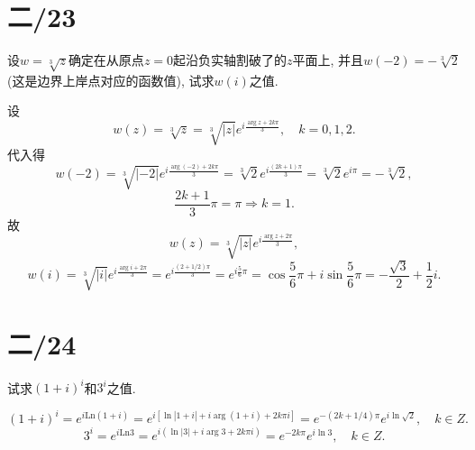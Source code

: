 \documentclass[11pt,a4paper]{article}
\begin{document}
\section{二/23}
\begin{problem}
设$w=\sqrt[3]{z}$确定在从原点$z=0$起沿负实轴割破了的$z$平面上, 并且$w(-2)=-\sqrt[3]{2}$(这是边界上岸点对应的函数值), 试求$w(i)$之值.
\end{problem}
设
$$w(z)=\sqrt[3]{z}=\sqrt[3]{|z|}e^{i\frac{\arg z+2k\pi}{3}},\quad k=0,1,2.$$
代入得
$$w(-2)=\sqrt[3]{|-2|}e^{i\frac{\arg(-2)+2k\pi}{3}}=\sqrt[3]{2}e^{i\frac{(2k+1)\pi}{3}}=\sqrt[3]{2}e^{i\pi}=-\sqrt[3]{2},$$
$$\frac{2k+1}{3}\pi=\pi\Longrightarrow k=1.$$
故
$$w(z)=\sqrt[3]{|z|}e^{i\frac{\arg z+2\pi}{3}},$$
$$w(i)=\sqrt[3]{|i|}e^{i\frac{\arg i+2\pi}{3}}=e^{i\frac{(2+1/2)\pi}{3}}=e^{i\frac{5}{6}\pi}=\cos\frac{5}{6}\pi+i\sin\frac{5}{6}\pi=-\frac{\sqrt{3}}{2}+\frac{1}{2}i.$$

\section{二/24}
\begin{problem}
试求$(1+i)^i$和$3^i$之值.
\end{problem}

$$(1+i)^i=e^{i\text{Ln}(1+i)}=e^{i[\ln|1+i|+i\arg(1+i)+2k\pi i]}=e^{-(2k+1/4)\pi}e^{i\ln\sqrt{2}},\quad k\in Z.$$
$$3^i=e^{i\text{Ln}3}=e^{i(\ln|3|+i\arg3+2k\pi i)}=e^{-2k\pi}e^{i\ln 3},\quad k\in Z.$$
\end{document}
